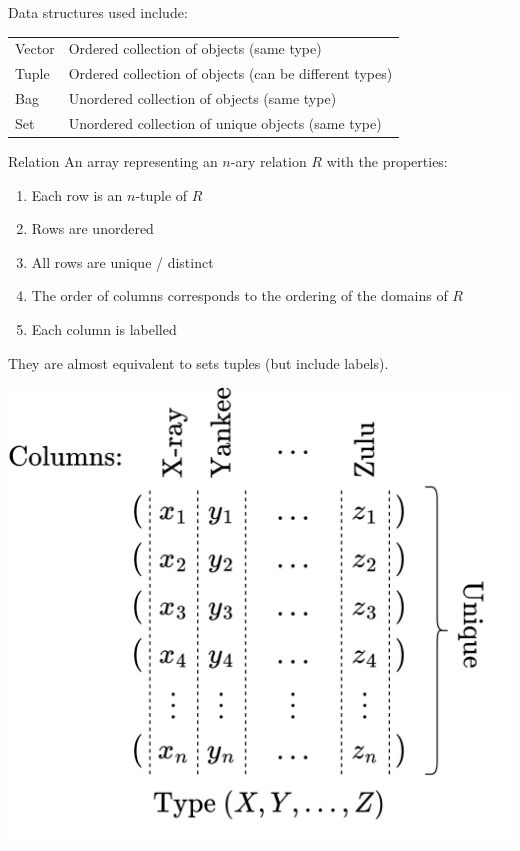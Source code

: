 Data structures used include:
\begin{center}
    \begin{tabular}{l p{}}
        Vector & Ordered collection of objects (same type) \\
        Tuple & Ordered collection of objects (can be different types) \\
        Bag & Unordered collection of objects (same type) \\
        Set & Unordered collection of unique objects (same type) \\
    \end{tabular}
\end{center}

\begin{definitionbox}{Relation}
    An array representing an $n$-ary relation $R$ with the properties:
    \\ \begin{minipage}{.49\textwidth}
        \begin{enumerate}
            \setlength\itemsep{0em}
            \item Each row is an $n$-tuple of $R$
            \item Rows are unordered
            \item All rows are unique / distinct
            \item The order of columns corresponds to the ordering of the domains of $R$
            \item Each column is labelled
        \end{enumerate}
        They are almost equivalent to sets tuples (but include labels).
    \end{minipage}
    \hfill
    \begin{minipage}{.5\textwidth}
        \begin{center}
            \includegraphics[width=\textwidth]{relational_algebra/images/relation.drawio.png}
        \end{center}
    \end{minipage}
\end{definitionbox}

